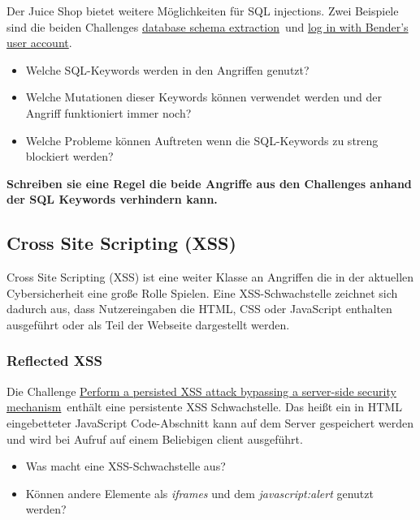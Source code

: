 Der Juice Shop bietet weitere Möglichkeiten für SQL injections.
Zwei Beispiele sind die beiden Challenges \glqq\href{https://pwning.owasp-juice.shop/companion-guide/latest/part2/injection.html#_exfiltrate_the_entire_db_schema_definition_via_sql_injection}{\underline{database schema extraction}}\grqq\ und \glqq\href{https://pwning.owasp-juice.shop/companion-guide/latest/part2/injection.html#_log_in_with_benders_user_account}{log in with Bender’s user account}\grqq.

\begin{itemize}
    \item Welche SQL-Keywords werden in den Angriffen genutzt?
    \item Welche Mutationen dieser Keywords können verwendet werden und der Angriff funktioniert immer noch?
    \item Welche Probleme können Auftreten wenn die SQL-Keywords zu streng blockiert werden?
\end{itemize}

\textbf{Schreiben sie eine Regel die beide Angriffe aus den Challenges anhand der SQL Keywords verhindern kann. }

\subsection{Cross Site Scripting (XSS)}

Cross Site Scripting (XSS) ist eine weiter Klasse an Angriffen die in der aktuellen Cybersicherheit eine große Rolle Spielen.
Eine XSS-Schwachstelle zeichnet sich dadurch aus, dass Nutzereingaben die HTML, CSS oder JavaScript enthalten ausgeführt oder als Teil der Webseite dargestellt werden.

\subsubsection{Reflected XSS}

Die Challenge \glqq\href{https://pwning.owasp-juice.shop/companion-guide/latest/part2/xss.html#_perform_a_persisted_xss_attack_bypassing_a_server_side_security_mechanism}{Perform a persisted XSS attack bypassing a server-side security mechanism}\grqq\ enthält eine persistente XSS Schwachstelle.
Das heißt ein in HTML eingebetteter JavaScript Code-Abschnitt kann auf dem Server gespeichert werden und wird bei Aufruf auf einem Beliebigen client ausgeführt.

\begin{itemize}
    \item Was macht eine XSS-Schwachstelle aus?
    \item Können andere Elemente als \textit{iframes} und dem \textit{javascript:alert} genutzt werden?
\end{itemize}\

